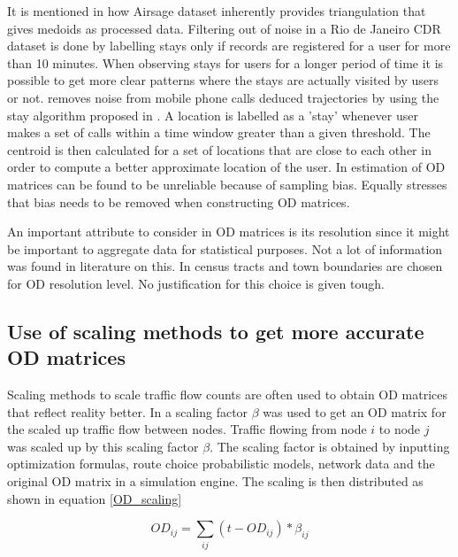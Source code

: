 \documentclass[12pt, a4paper]{report}
\theoremstyle{definition}
\theoremstyle{definition}%
\theoremstyle{definition}%
\theoremstyle{definition}%
\theoremstyle{definition}%
\theoremstyle{definition}%
\begin{document}
It is mentioned in \cite{Colak2015} how Airsage dataset inherently provides triangulation that gives medoids as processed data. Filtering out of noise in a Rio de Janeiro CDR dataset is done by labelling stays only if records are registered for a user for more than 10 minutes. When observing stays for users for a longer period of time it is possible to get more clear patterns where the stays are actually visited by users or not. \cite{Toole2015} removes noise from mobile phone calls deduced trajectories by using the stay algorithm proposed in \cite{Zheng2011}. A location is labelled as a 'stay' whenever user makes a set of calls within a time window greater than a given threshold. The centroid is then calculated for a set of locations that are close to each other in order to compute a better approximate location of the user. In \cite{Iqbal2014}  estimation of OD matrices can be found to be unreliable because of sampling bias. Equally \cite{Toole2015} stresses that bias needs to be removed when constructing OD matrices.

An important attribute to consider in OD matrices is its resolution since it might be important to aggregate data for statistical purposes. Not a lot of information was found in literature on this. In \cite{Colak2015} census tracts and town boundaries are chosen for OD resolution level. No justification for this choice is given tough.

\subsection{Use of scaling methods to get more accurate OD matrices} \label{subsection:OD_scaling}

Scaling methods to scale traffic flow counts are often used to obtain OD matrices that reflect reality better. In \cite{Iqbal2014} a scaling factor $\beta$ was used to get an OD matrix for the scaled up traffic flow between nodes. Traffic flowing from node $i$ to node $j$ was scaled up by this scaling factor $\beta$. The scaling factor is obtained by inputting optimization formulas, route choice probabilistic models, network data and the original OD matrix in a simulation engine. The scaling is then distributed as shown in equation \ref{OD_scaling}

\begin{equation}\label{OD_scaling}
\textit{OD}_{ij} = \sum _{ij} (t-OD_{ij}) * \beta_{ij} 
\end{equation}
\end{document}
